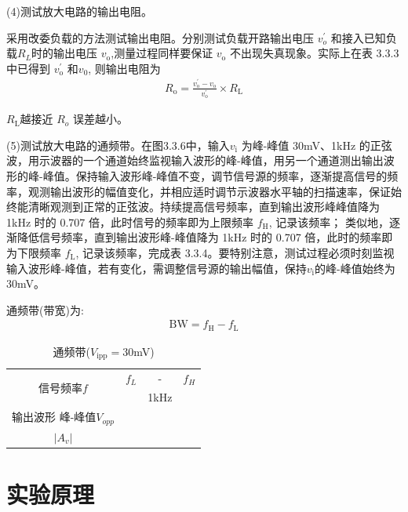 \documentclass[a4paper,11pt,UTF8]{article}
\numberwithin{equation}{subsection}
\begin{document}
(4)测试放大电路的输出电阻。

采用改委负载的方法测试输出电阻。分别测试负载开路输出电压 $v_o^{\prime}$ 和接入已知负载$R_L$时的输出电压 $v_\mathrm{o}$,测量过程同样要保证 $v_\mathrm{o}$ 不出现失真现象。实际上在表 3.3.3 中已得到 $v_\mathrm{o}^{\prime}$ 和$v_0$, 则输出电阻为
\begin{align}
	R_\mathrm{o}=\frac{v_\mathrm{o}^{\prime}-v_\mathrm{o}}{v_\mathrm{o}^{\prime}}\times R_\mathrm{L}
\end{align}

$R_{\mathrm{L}}$越接近 $R_{o}$ 误差越小。

(5)测试放大电路的通频带。在图3.3.6中，输入$v_\mathrm{i}$ 为峰-峰值 30mV、1kHz 的正弦波，用示波器的一个通道始终监视输入波形的峰-峰值，用另一个通道测出输出波形的峰-峰值。保持输入波形峰-峰值不变，调节信号源的频率，逐渐提高信号的频率，观测输出波形的幅值变化，并相应适时调节示波器水平轴的扫描速率，保证始终能清晰观测到正常的正弦波。持续提高信号频率，直到输出波形峰峰值降为 1kHz 时的 0.707 倍，此时信号的频率即为上限频率 $f_\mathrm{H}$, 记录该频率； 类似地，逐渐降低信号频率，直到输出波形峰-峰值降为 1kHz 时的 0.707 倍，此时的频率即为下限频率 $f_\mathrm{L}$, 记录该频率，完成表 3.3.4。要特别注意，测试过程必须时刻监视输入波形峰-峰值，若有变化，需调整信号源的输出幅值，保持$v_\mathrm{i}$的峰-峰值始终为 30mV。

通频带(带宽)为: 
\begin{align}\mathrm{BW}=f_{\mathrm{H}}-f_{\mathrm{L}}\end{align}
\begin{table}[H]
	\centering
	\begin{tabular}{|c|c|c|c|}
		\hline
		\multirow{2}{*}{信号频率$f$} & $f_L$ & - & $f_H$\\
		\cline{2-4}
		&&1kHz&\\	
		\hline
		\shortstack{输出波形\\峰-峰值$V_{opp}$}&&&\\
		\hline
		$|A_v|$&&&\\
		\hline	
	\end{tabular}
	\caption{通频带($V_{\mathrm{ipp}}=30$mV)}
\end{table}
\section{实验原理}
\end{document}
